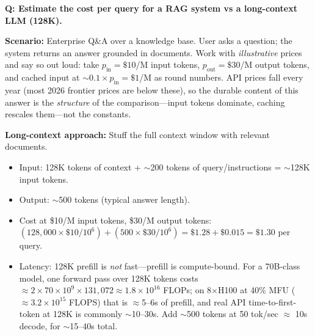 
\begin{interviewq}
\textbf{Q: Estimate the cost per query for a RAG system vs a long-context LLM (128K).}

 \quad {} \quad \badgefreq{\freqhigh}

\stronganswer

\textbf{Scenario:} Enterprise Q\&A over a knowledge base. User asks a question; the system returns an answer grounded in documents. Work with \textit{illustrative} prices and say so out loud: take $p_{\text{in}} = \$10$/M input tokens, $p_{\text{out}} = \$30$/M output tokens, and cached input at $\sim 0.1 \times p_{\text{in}} = \$1$/M as round numbers. API prices fall every year (most 2026 frontier prices are below these), so the durable content of this answer is the \textit{structure} of the comparison---input tokens dominate, caching rescales them---not the constants.

\textbf{Long-context approach:} Stuff the full context window with relevant documents.
\begin{itemize}
    \item Input: 128K tokens of context + $\sim$200 tokens of query/instructions = $\sim$128K input tokens.
    \item Output: $\sim$500 tokens (typical answer length).
    \item Cost at \$10/M input tokens, \$30/M output tokens: $(128{,}000 \times \$10 / 10^6) + (500 \times \$30 / 10^6) = \$1.28 + \$0.015 = \$1.30$ per query.
    \item Latency: 128K prefill is \textit{not} fast---prefill is compute-bound. For a 70B-class model, one forward pass over 128K tokens costs $\approx 2 \times 70 \times 10^9 \times 131{,}072 \approx 1.8 \times 10^{16}$ FLOPs; on 8$\times$H100 at 40\% MFU ($\approx 3.2 \times 10^{15}$ FLOPS) that is $\approx$5--6s of prefill, and real API time-to-first-token at 128K is commonly $\sim$10--30s. Add $\sim$500 tokens at 50 tok/sec $\approx$ 10s decode, for $\sim$15--40s total.
\end{itemize}


\end{interviewq}
